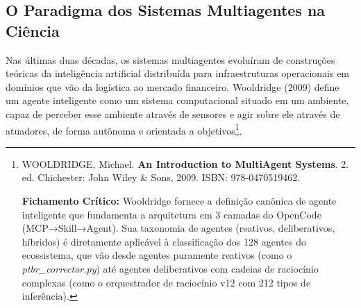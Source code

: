 \subsection{O Paradigma dos Sistemas Multiagentes na Ciência}

Nas últimas duas décadas, os sistemas multiagentes evoluíram de construções teóricas da inteligência artificial distribuída para infraestruturas operacionais em domínios que vão da logística ao mercado financeiro. Wooldridge (2009) define um agente inteligente como um sistema computacional situado em um ambiente, capaz de perceber esse ambiente através de sensores e agir sobre ele através de atuadores, de forma autônoma e orientada a objetivos\footnote{
  WOOLDRIDGE, Michael. \textbf{An Introduction to MultiAgent Systems}. 2. ed. Chichester: John Wiley \& Sons, 2009. ISBN: 978-0470519462.

  \textbf{Fichamento Crítico:} Wooldridge fornece a definição canônica de agente inteligente que fundamenta a arquitetura em 3 camadas do OpenCode (MCP→Skill→Agent). Sua taxonomia de agentes (reativos, deliberativos, híbridos) é diretamente aplicável à classificação dos 128 agentes do ecossistema, que vão desde agentes puramente reativos (como o \textit{ptbr\_corrector.py}) até agentes deliberativos com cadeias de raciocínio complexas (como o orquestrador de raciocínio v12 com 212 tipos de inferência).
}.

